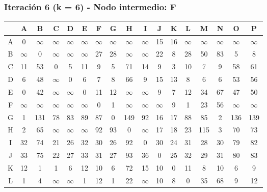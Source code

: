 \documentclass[12pt]{article}
\begin{document}
\subsubsection{Iteración 6 (k = 6) - Nodo intermedio: F}
\begin{table}[h!]
\centering
\begin{tabular}{|c|c|c|c|c|c|c|c|c|c|c|c|c|c|c|c|c|}
\hline
 & A & B & C & D & E & F & G & H & I & J & K & L & M & N & O & P \\\hline
A & 0 & $\infty$ & $\infty$ & $\infty$ & $\infty$ & $\infty$ & $\infty$ & $\infty$ & $\infty$ & 15 & 16 & $\infty$ & $\infty$ & $\infty$ & $\infty$ & $\infty$ \\\hline
B & $\infty$ & 0 & $\infty$ & $\infty$ & $\infty$ & 27 & \cellcolor{lightgreen} 28 & $\infty$ & $\infty$ & 22 & 8 & \cellcolor{lightgreen} 28 & \cellcolor{lightgreen} 50 & \cellcolor{lightgreen} 83 & 5 & 8 \\\hline
C & 11 & 53 & 0 & 5 & 11 & 9 & 5 & 71 & 14 & 9 & 3 & \cellcolor{lightgreen} 10 & 7 & 9 & 58 & 61 \\\hline
D & 6 & 48 & $\infty$ & 0 & 6 & 7 & \cellcolor{lightgreen} 8 & 66 & 9 & 15 & 13 & \cellcolor{lightgreen} 8 & 6 & 6 & 53 & 56 \\\hline
E & 0 & 42 & $\infty$ & $\infty$ & 0 & 11 & \cellcolor{lightgreen} 12 & $\infty$ & $\infty$ & 9 & 7 & 12 & \cellcolor{lightgreen} 34 & \cellcolor{lightgreen} 67 & 47 & 50 \\\hline
F & $\infty$ & $\infty$ & $\infty$ & $\infty$ & $\infty$ & 0 & 1 & $\infty$ & $\infty$ & $\infty$ & 9 & 1 & 23 & 56 & $\infty$ & $\infty$ \\\hline
G & 1 & 131 & 78 & 83 & 89 & 87 & 0 & 149 & 92 & 16 & 17 & \cellcolor{lightgreen} 88 & 85 & 2 & 136 & 139 \\\hline
H & 2 & 65 & $\infty$ & $\infty$ & $\infty$ & 92 & \cellcolor{lightgreen} 93 & 0 & $\infty$ & 17 & 18 & 23 & \cellcolor{lightgreen} 115 & 3 & 70 & 73 \\\hline
I & 32 & 74 & 21 & 26 & 32 & 30 & 26 & 92 & 0 & 30 & 24 & \cellcolor{lightgreen} 31 & 28 & 30 & 79 & 82 \\\hline
J & 33 & 75 & 22 & 27 & 33 & 31 & 27 & 93 & 36 & 0 & 25 & \cellcolor{lightgreen} 32 & 29 & 31 & 80 & 83 \\\hline
K & 12 & 1 & 1 & 6 & 12 & 10 & 6 & 72 & 15 & 10 & 0 & \cellcolor{lightgreen} 11 & 8 & 10 & 6 & 9 \\\hline
L & 1 & 4 & $\infty$ & $\infty$ & 1 & 12 & 1 & 22 & $\infty$ & 10 & 8 & 0 & \cellcolor{lightgreen} 35 & \cellcolor{lightgreen} 68 & 9 & 12 \\\hline

\end{tabular}
\end{table}
\end{document}
